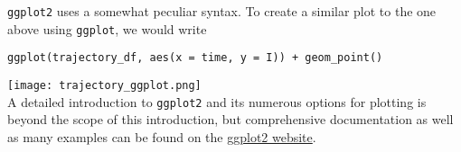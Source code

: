 \documentclass[11pt,a4paper]{article}
\begin{document}
\texttt{ggplot2} uses a somewhat peculiar syntax. To create a similar plot to the one above using \texttt{ggplot}, we would write \\

\begin{verbatim}
ggplot(trajectory_df, aes(x = time, y = I)) + geom_point()
\end{verbatim}

\texttt{[image: trajectory\_ggplot.png]} \\

A detailed introduction to \texttt{ggplot2} and its numerous options for plotting is beyond the scope of this introduction, but comprehensive documentation as well as many examples can be found on the \href{http://ggplot2.org/}{ggplot2 website}. \\
\end{document}
